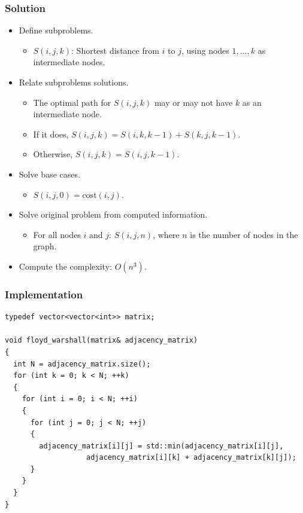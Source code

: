 \documentclass{beamer}
\begin{document}
\begin{frame}%
\frametitle{Solution}
\begin{itemize}

\item Define subproblems.
\begin{itemize}
\item<1-> $S(i, j, k)$: Shortest distance from $i$ to $j$, using nodes $1, \ldots, k$ as intermediate nodes.
\end{itemize}

\vspace{0.2cm}

\item<2-> Relate subproblems solutions.
\begin{itemize}
\item<2-> The optimal path for $S(i, j, k)$ may or may not have $k$ as an intermediate node.
\item<3-> If it does, $S(i, j, k) = S(i, k, k - 1) + S(k, j, k - 1)$.
\item<4-> Otherwise, $S(i, j, k) = S(i, j, k - 1)$.
\end{itemize}

\vspace{0.2cm}

\item<5-> Solve base cases.
\begin{itemize}
\item<5-> $S(i, j, 0) = \textrm{cost}(i, j)$.
\end{itemize}

\vspace{0.2cm}

\item<6-> Solve original problem from computed information.
\begin{itemize}
\item<6-> For all nodes $i$ and $j$: $S(i, j, n)$, where $n$ is the number of nodes in the graph.
\end{itemize}

\vspace{0.2cm}

\item<7-> Compute the complexity: $O(n^3)$.

\end{itemize}

\end{frame}

\begin{frame}[containsverbatim]
\frametitle{Implementation}

\scriptsize
\begin{lstlisting}
typedef vector<vector<int>> matrix;

void floyd_warshall(matrix& adjacency_matrix)
{
  int N = adjacency_matrix.size();
  for (int k = 0; k < N; ++k)
  {
    for (int i = 0; i < N; ++i)
    {
      for (int j = 0; j < N; ++j)
      {
        adjacency_matrix[i][j] = std::min(adjacency_matrix[i][j],
                   adjacency_matrix[i][k] + adjacency_matrix[k][j]);
      }
    }
  }
}
\end{lstlisting}

\end{frame}
\end{document}
